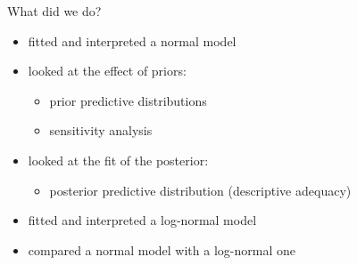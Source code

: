 \documentclass[12pt,ignorenonframetext,aspectratio=169]{beamer}
\providecommand{\tightlist}{%
  \setlength{\itemsep}{0pt}\setlength{\parskip}{0pt}}
\begin{document}
\begin{frame}{What did we do?}
\protect\hypertarget{what-did-we-do}{}

\begin{itemize}
\tightlist
\item
  fitted and interpreted a normal model
\item
  looked at the effect of priors:

  \begin{itemize}
  \tightlist
  \item
    prior predictive distributions
  \item
    sensitivity analysis
  \end{itemize}
\item
  looked at the fit of the posterior:

  \begin{itemize}
  \tightlist
  \item
    posterior predictive distribution (descriptive adequacy)
  \end{itemize}
\item
  fitted and interpreted a log-normal model
\item
  compared a normal model with a log-normal one
\end{itemize}

\end{frame}
\end{document}
